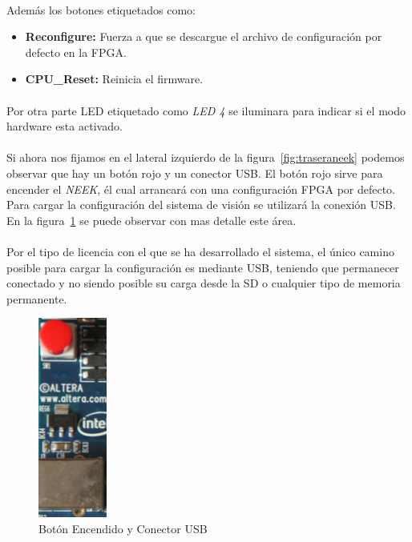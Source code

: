 \documentclass[a4paper,12pt,titlepage,final]{book}
\begin{document}
\paragraph{}
Además los botones etiquetados como:
\begin{itemize}
\item \textbf{Reconfigure:} Fuerza a que se descargue el archivo de configuración por defecto en la FPGA. 
\item \textbf{CPU\_Reset:} Reinicia el firmware.
\end{itemize}

\paragraph{}
Por otra parte LED etiquetado como \textit{LED 4} se iluminara para indicar si el modo hardware esta activado. 

\paragraph{}
Si ahora nos fijamos en el lateral izquierdo de la figura~\ref{fig:traseraneek} podemos observar que hay un botón rojo y un conector USB. El botón rojo sirve para encender el \textit{NEEK}, él cual arrancará con una configuración FPGA por defecto. Para cargar la configuración del sistema de visión se utilizará la conexión USB. En la figura~\ref{fig:botonusb} se puede observar con mas detalle este área.

\paragraph{}
Por el tipo de licencia con el que se ha desarrollado el sistema, el único camino posible para cargar la configuración es mediante USB, teniendo que permanecer conectado y no siendo posible su carga desde la SD o cualquier tipo de memoria permanente.

\begin{figure}[p]
\centering
\includegraphics[width=0.2\textwidth]{./figuras/NEEK/BotonPowerUSB.png}
\caption{Botón Encendido y Conector USB}
\label{fig:botonusb}
\end{figure}
\end{document}
